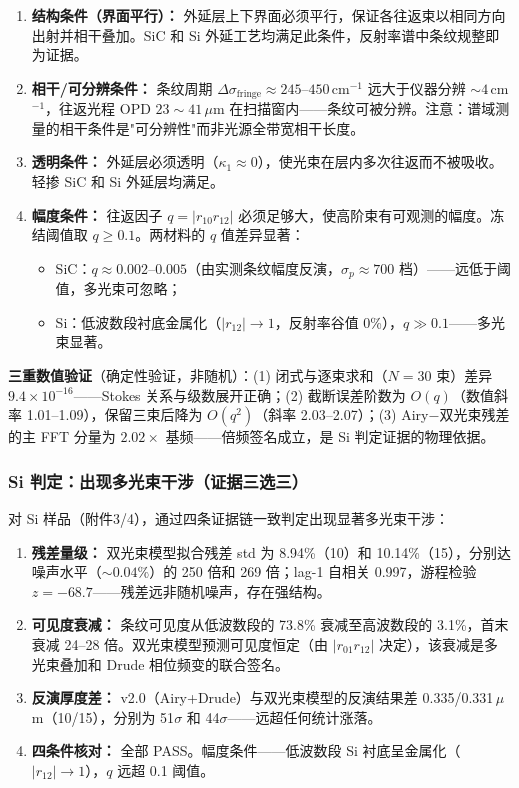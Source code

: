 \begin{enumerate}
\item \textbf{结构条件（界面平行）：} 外延层上下界面必须平行，保证各往返束以相同方向出射并相干叠加。SiC 和 Si 外延工艺均满足此条件，反射率谱中条纹规整即为证据。

\item \textbf{相干/可分辨条件：} 条纹周期 $\Delta\sigma_{\text{fringe}}\approx 245$--$450$\,cm$^{-1}$ 远大于仪器分辨 $\sim4$\,cm$^{-1}$，往返光程 OPD $23\sim41\,\mu$m 在扫描窗内——条纹可被分辨。注意：谱域测量的相干条件是"可分辨性"而非光源全带宽相干长度。

\item \textbf{透明条件：} 外延层必须透明（$\kappa_1\approx0$），使光束在层内多次往返而不被吸收。轻掺 SiC 和 Si 外延层均满足。

\item \textbf{幅度条件：} 往返因子 $q=|r_{10}r_{12}|$ 必须足够大，使高阶束有可观测的幅度。冻结阈值取 $q\geq0.1$。两材料的 $q$ 值差异显著：
  \begin{itemize}
    \item SiC：$q\approx0.002$--$0.005$（由实测条纹幅度反演，$\sigma_p\approx700$ 档）——远低于阈值，多光束可忽略；
    \item Si：低波数段衬底金属化（$|r_{12}|\to1$，反射率谷值 0\%），$q\gg0.1$——多光束显著。
  \end{itemize}
\end{enumerate}

\textbf{三重数值验证}（确定性验证，非随机）：(1) 闭式与逐束求和（$N=30$ 束）差异 $9.4\times10^{-16}$——Stokes 关系与级数展开正确；(2) 截断误差阶数为 $O(q)$（数值斜率 1.01--1.09），保留三束后降为 $O(q^2)$（斜率 2.03--2.07）；(3) Airy$-$双光束残差的主 FFT 分量为 $2.02\times$ 基频——倍频签名成立，是 Si 判定证据的物理依据。

\subsubsection{Si 判定：出现多光束干涉（证据三选三）}

对 Si 样品（附件3/4），通过四条证据链一致判定出现显著多光束干涉：

\begin{enumerate}
\item \textbf{残差量级：} 双光束模型拟合残差 std 为 8.94\%（10\degree）和 10.14\%（15\degree），分别达噪声水平（$\sim0.04\%$）的 250 倍和 269 倍；lag-1 自相关 0.997，游程检验 $z=-68.7$——残差远非随机噪声，存在强结构。

\item \textbf{可见度衰减：} 条纹可见度从低波数段的 73.8\% 衰减至高波数段的 3.1\%，首末衰减 24--28 倍。双光束模型预测可见度恒定（由 $|r_{01}r_{12}|$ 决定），该衰减是多光束叠加和 Drude 相位频变的联合签名。

\item \textbf{反演厚度差：} v2.0（Airy+Drude）与双光束模型的反演结果差 0.335/0.331\,$\mu$m（10\degree/15\degree），分别为 51$\sigma$ 和 44$\sigma$——远超任何统计涨落。

\item \textbf{四条件核对：} 全部 PASS。幅度条件——低波数段 Si 衬底呈金属化（$|r_{12}|\to1$），$q$ 远超 0.1 阈值。
\end{enumerate}

